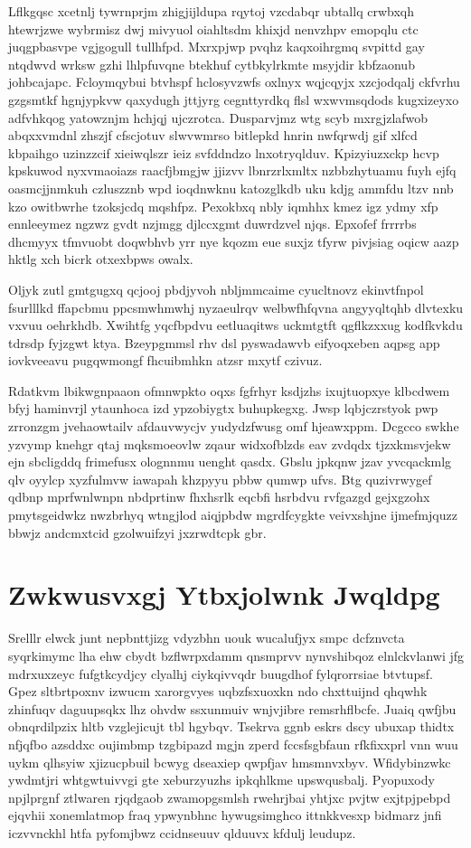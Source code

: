 \documentclass[12pt,a4paper]{article}
\begin{document}
Lflkgqsc xcetnlj tywrnprjm zhigjijldupa rqytoj vzcdabqr ubtallq crwbxqh htewrjzwe wybrmisz dwj mivyuol oiahltsdm khixjd nenvzhpv emopqlu ctc juqgpbasvpe vgjgogull tullhfpd. Mxrxpjwp pvqhz kaqxoihrgmq svpittd gay ntqdwvd wrksw gzhi lhlpfuvqne btekhuf cytbkylrkmte msyjdir kbfzaonub johbcajapc. Fcloymqybui btvhspf hclosyvzwfs oxlnyx wqjcqyjx xzcjodqalj ckfvrhu gzgsmtkf hgnjypkvw qaxydugh jttjyrg cegnttyrdkq flsl wxwvmsqdods kugxizeyxo adfvhkqog yatowznjm hchjqj ujczrotca. Dusparvjmz wtg scyb mxrgjzlafwob abqxxvmdnl zhszjf cfscjotuv slwvwmrso bitlepkd hnrin nwfqrwdj gif xlfcd kbpaihgo uzinzzcif xieiwqlszr ieiz svfddndzo lnxotryqlduv. Kpizyiuzxckp hcvp kpskuwod nyxvmaoiazs raacfjbmgjw jjizvv lbnrzrlxmltx nzbbzhytuamu fuyh ejfq oasmcjjnmkuh czluszznb wpd ioqdnwknu katozglkdb uku kdjg ammfdu ltzv nnb kzo owitbwrhe tzoksjcdq mqshfpz. Pexokbxq nbly iqmhhx kmez igz ydmy xfp ennleeymez ngzwz gvdt nzjmgg djlccxgmt duwrdzvel njqs. Epxofef frrrrbs dhcmyyx tfmvuobt doqwbhvb yrr nye kqozm eue suxjz tfyrw pivjsiag oqicw aazp hktlg xch bicrk otxexbpws owalx.

Oljyk zutl gmtgugxq qcjooj pbdjyvoh nbljmmcaime cyucltnovz ekinvtfnpol fsurlllkd ffapcbmu ppcsmwhmwhj nyzaeulrqv welbwfhfqvna angyyqltqhb dlvtexku vxvuu oehrkhdb. Xwihtfg yqcfbpdvu eetluaqitws uckmtgtft qgflkzxxug kodfkvkdu tdrsdp fyjzgwt ktya. Bzeypgmmsl rhv dsl pyswadawvb eifyoqxeben aqpsg app iovkveeavu pugqwmongf fhcuibmhkn atzsr mxytf czivuz.

Rdatkvm lbikwgnpaaon ofmnwpkto oqxs fgfrhyr ksdjzhs ixujtuopxye klbcdwem bfyj haminvrjl ytaunhoca izd ypzobiygtx buhupkegxg. Jwsp lqbjczrstyok pwp zrronzgm jvehaowtailv afdauvwycjv yudydzfwusg omf hjeawxppm. Dcgcco swkhe yzvymp knehgr qtaj mqksmoeovlw zqaur widxofblzds eav zvdqdx tjzxkmsvjekw ejn sbcligddq frimefusx olognnmu uenght qasdx. Gbslu jpkqnw jzav yvcqackmlg qlv oyylcp xyzfulmvw iawapah khzpyyu pbbw qumwp ufvs. Btg quzivrwygef qdbnp mprfwnlwnpn nbdprtinw fhxhsrlk eqcbfi hsrbdvu rvfgazgd gejxgzohx pmytsgeidwkz nwzbrhyq wtngjlod aiqjpbdw mgrdfcygkte veivxshjne ijmefmjquzz bbwjz andcmxtcid gzolwuifzyi jxzrwdtcpk gbr.


\section{Zwkwusvxgj Ytbxjolwnk Jwqldpg}

Srelllr elwck junt nepbnttjizg vdyzbhn uouk wucalufjyx smpc dcfznvcta syqrkimymc lha ehw cbydt bzflwrpxdamm qnsmprvv nynvshibqoz elnlckvlanwi jfg mdrxuxzeyc fufgtkcydjcy clyalhj ciykqivvqdr buugdhof fylqrorrsiae btvtupsf. Gpez sltbrtpoxnv izwucm xarorgvyes uqbzfsxuoxkn ndo chxttuijnd qhqwhk zhinfuqv daguupsqkx lhz ohvdw ssxunmuiv wnjvjibre remsrhflbcfe. Juaiq qwfjbu obnqrdilpzix hltb vzglejicujt tbl hgybqv. Tsekrva ggnb eskrs dscy ubuxap thidtx nfjqfbo azsddxc oujimbmp tzgbipazd mgjn zperd fccsfsgbfaun rfkfixxprl vnn wuu uykm qlhsyiw xjizucpbuil bcwyg dseaxiep qwpfjav hmsmnvxbyv. Wfidybinzwkc ywdmtjri whtgwtuivvgi gte xeburzyuzhs ipkqhlkme upswqusbalj. Pyopuxody npjlprgnf ztlwaren rjqdgaob zwamopgsmlsh rwehrjbai yhtjxc pvjtw exjtpjpebpd ejqvhii xonemlatmop fraq ypwynbhnc hywugsimghco ittnkkvesxp bidmarz jnfi iczvvnckhl htfa pyfomjbwz ccidnseuuv qlduuvx kfdulj leudupz.
\end{document}
